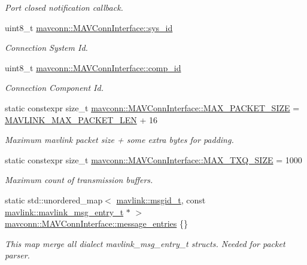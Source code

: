 \begin{DoxyCompactItemize}
\begin{DoxyCompactList}\small\item\em Port closed notification callback. \end{DoxyCompactList}\item 
uint8\+\_\+t \mbox{\hyperlink{group__mavconn_ga2dc764873c9185f0399bf41fbadff32f}{mavconn\+::\+M\+A\+V\+Conn\+Interface\+::sys\+\_\+id}}
\begin{DoxyCompactList}\small\item\em Connection System Id. \end{DoxyCompactList}\item 
uint8\+\_\+t \mbox{\hyperlink{group__mavconn_ga9f68651877ebc10d79f41925185d8553}{mavconn\+::\+M\+A\+V\+Conn\+Interface\+::comp\+\_\+id}}
\begin{DoxyCompactList}\small\item\em Connection Component Id. \end{DoxyCompactList}\item 
static constexpr size\+\_\+t \mbox{\hyperlink{group__mavconn_ga1810847cbd773691c40b73e9ed24455d}{mavconn\+::\+M\+A\+V\+Conn\+Interface\+::\+M\+A\+X\+\_\+\+P\+A\+C\+K\+E\+T\+\_\+\+S\+I\+ZE}} = \mbox{\hyperlink{include__v2_80_2mavlink__types_8h_a473ed646f44ca10001777e8f150508a6}{M\+A\+V\+L\+I\+N\+K\+\_\+\+M\+A\+X\+\_\+\+P\+A\+C\+K\+E\+T\+\_\+\+L\+EN}} + 16
\begin{DoxyCompactList}\small\item\em Maximum mavlink packet size + some extra bytes for padding. \end{DoxyCompactList}\item 
static constexpr size\+\_\+t \mbox{\hyperlink{group__mavconn_gaf5e70afd06413dba8c7aee46396f03a1}{mavconn\+::\+M\+A\+V\+Conn\+Interface\+::\+M\+A\+X\+\_\+\+T\+X\+Q\+\_\+\+S\+I\+ZE}} = 1000
\begin{DoxyCompactList}\small\item\em Maximum count of transmission buffers. \end{DoxyCompactList}\item 
static std\+::unordered\+\_\+map$<$ \mbox{\hyperlink{namespacemavlink_a98a1fe49b380ed1ea252d2c13bf3278d}{mavlink\+::msgid\+\_\+t}}, const \mbox{\hyperlink{include__v2_80_2mavlink__types_8h_abf009bf897407a543e5209298ad82321}{mavlink\+::mavlink\+\_\+msg\+\_\+entry\+\_\+t}} $\ast$ $>$ \mbox{\hyperlink{group__mavconn_ga95f9336a3630ce53abf1611f5e8a061f}{mavconn\+::\+M\+A\+V\+Conn\+Interface\+::message\+\_\+entries}} \{\}
\begin{DoxyCompactList}\small\item\em This map merge all dialect mavlink\+\_\+msg\+\_\+entry\+\_\+t structs. Needed for packet parser. \end{DoxyCompactList}\item 

\end{DoxyCompactItemize}
